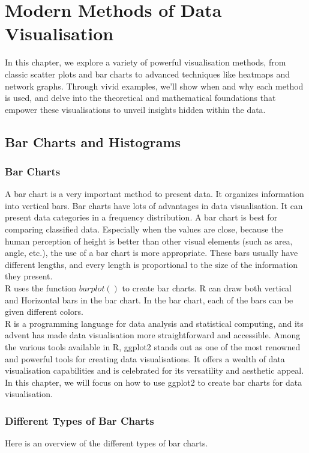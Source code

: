 \documentclass{article}\usepackage[]{graphicx}\usepackage[]{xcolor}
\begin{document}
\newpage

\section{Modern Methods of Data Visualisation}

In this chapter, we explore a variety of powerful visualisation methods, from classic scatter plots and bar charts to advanced techniques like heatmaps and network graphs. Through vivid examples, we'll show when and why each method is used, and delve into the theoretical and mathematical foundations that empower these visualisations to unveil insights hidden within the data.

\subsection{Bar Charts and Histograms}
\subsubsection{Bar Charts}
A bar chart is a very important method to present data. It organizes information into vertical bars.  Bar charts have lots of advantages in data visualisation. It can present data categories in a frequency distribution. A bar chart is best for comparing classified data. Especially when the values are close, because the human perception of height is better than other visual elements (such as area, angle, etc.), the use of a bar chart is more appropriate. These bars usually have different lengths, and every length is proportional to the size of the information they present.\\

\noindent
R uses the function $barplot()$ to create bar charts. R can draw both vertical and Horizontal bars in the bar chart. In the bar chart, each of the bars can be given different colors.\\

\noindent
R is a programming language for data analysis and statistical computing, and its advent has made data visualisation more straightforward and accessible. Among the various tools available in R, ggplot2 stands out as one of the most renowned and powerful tools for creating data visualisations. It offers a wealth of data visualisation capabilities and is celebrated for its versatility and aesthetic appeal. In this chapter, we will focus on how to use ggplot2 to create bar charts for data visualisation.

\subsubsection{Different Types of Bar Charts}
Here is an overview of the different types of bar charts. \\
\end{document}
